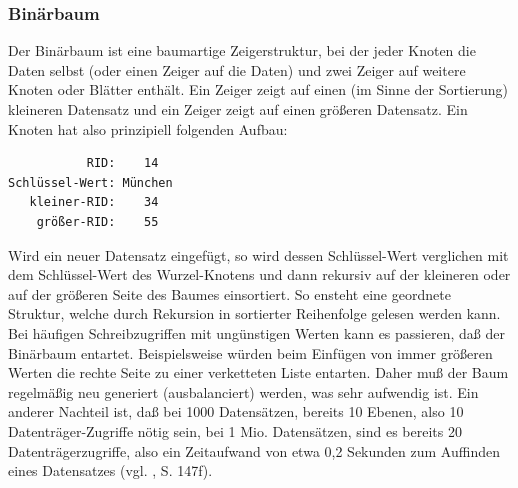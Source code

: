 \subsubsection{Binärbaum}
Der Binärbaum ist eine baumartige Zeigerstruktur, bei der jeder Knoten die Daten selbst (oder einen Zeiger auf die Daten) und zwei Zeiger auf weitere Knoten oder Blätter enthält. Ein Zeiger zeigt auf einen (im Sinne der Sortierung) kleineren Datensatz und ein Zeiger zeigt auf einen größeren Datensatz. Ein Knoten hat also prinzipiell folgenden Aufbau:
\begin{lstlisting}
           RID:    14
Schlüssel-Wert: München
   kleiner-RID:    34
    größer-RID:    55
\end{lstlisting}
Wird ein neuer Datensatz eingefügt, so wird dessen Schlüssel-Wert verglichen mit dem Schlüssel-Wert des Wurzel-Knotens und dann rekursiv auf der kleineren oder auf der größeren Seite des Baumes einsortiert. So ensteht eine geordnete Struktur, welche durch Rekursion in sortierter Reihenfolge gelesen werden kann. Bei häufigen Schreibzugriffen mit ungünstigen Werten kann es passieren, daß der Binärbaum entartet. Beispielsweise würden beim Einfügen von immer größeren Werten die rechte Seite zu einer verketteten Liste entarten. Daher muß der Baum regelmäßig neu generiert (ausbalanciert) werden, was sehr aufwendig ist. Ein anderer Nachteil ist, daß bei 1000 Datensätzen, bereits 10 Ebenen, also 10 Datenträger-Zugriffe nötig sein, bei 1 Mio. Datensätzen, sind es bereits 20 Datenträgerzugriffe, also ein Zeitaufwand von etwa 0,2 Sekunden zum Auffinden eines Datensatzes (vgl. \cite{Sauer1998}, S. 147f).

